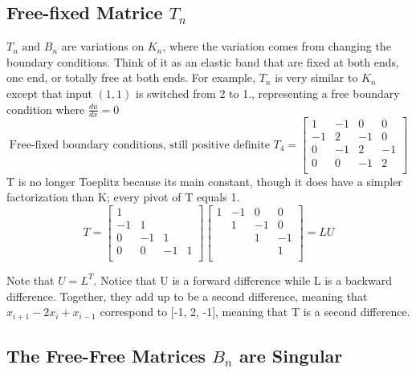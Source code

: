 \subsection{Free-fixed Matrice \(T_n\)}

\(T_n \text{ and } B_n\) are variations on \(K_n\), where the variation comes from changing the boundary conditions.
Think of it as an elastic band that are fixed at both ends, one end, or totally free at both ends.  
For example, \(T_n\) is very similar to \(K_n\) except that input \((1, 1)\) is switched from 2 to 1., representing a free boundary condition where \(\frac{du}{dx} = 0\)
\[
    \text{Free-fixed boundary conditions, still positive definite }
    T_4 =
    \begin{bmatrix}
        1 & -1 & 0 & 0  \\
        -1 & 2 & -1 & 0  \\
        0 &  -1 & 2 & -1  \\
        0 & 0 & -1 & 2  \\
    \end{bmatrix}
\]    
T is no longer Toeplitz because its main constant, though it does have a simpler factorization than K; every pivot of T equals 1.
\[
    T =
    \begin{bmatrix}
        1 &  &  &   \\
        -1 & 1 &  &   \\
        0 & -1 & 1 &   \\
        0 & 0 & -1 & 1  \\
    \end{bmatrix}
    \begin{bmatrix}
        1 & -1 & 0 & 0  \\
         & 1 & -1 & 0 \\
         &  & 1 & -1  \\
         &  &  & 1  \\
    \end{bmatrix}
    = LU
\]

Note that \(U = L^T\).
Notice that U is a forward difference while L is a backward difference.
Together, they add up to be a second difference, meaning that \(x_{i+1} - 2x_i + x_{i-1}  \) correspond to [-1, 2, -1], meaning that T is a second difference. 

\subsection{The Free-Free Matrices \(B_n\) are Singular}

